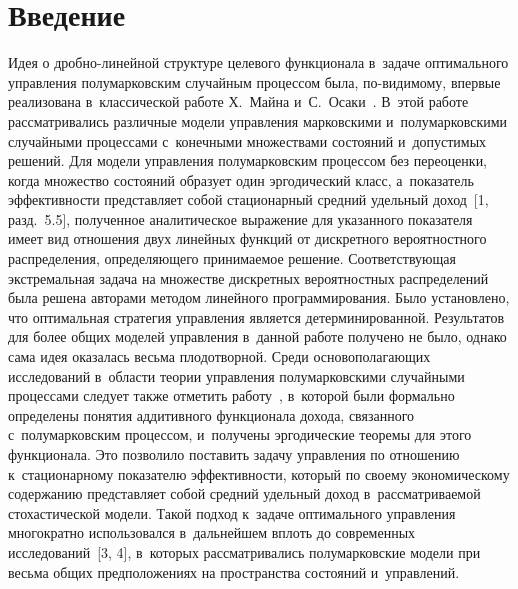
\thispagestyle{headings}

\begin{multicols}{2}

\label{st\stat}

\section{Введение}

\vspace*{-2pt}

Идея о дробно-ли\-ней\-ной структуре целевого функционала в~задаче оптимального 
управления полумарковским случайным процессом была, по-видимому, впервые 
реализована в~классической работе Х.~Майна и~С.~Осаки~\cite{1}. В~этой работе 
рассматривались различные модели управления марковскими и~полумарковскими 
случайными процессами с~конечными множествами состояний и~допустимых решений. 
Для модели управ\-ле\-ния полумарковским процессом без переоценки, когда множество 
состояний образует один эргодический класс, а~показатель эффективности 
представляет собой стационарный средний удельный доход~[1, разд.~5.5], 
полученное аналитическое выражение для указанного показателя имеет вид отношения\linebreak 
двух линейных функций от дискретного вероятностного распределения, определяющего 
принимаемое решение. Со\-от\-вет\-ст\-ву\-ющая \mbox{экстремальная} задача на множестве 
дискретных вероятностных распределений была решена авторами методом линейного 
программирования. Было установлено, что оптимальная стратегия управления 
является детерминированной. Результатов для более общих моделей управления 
в~данной работе получено не было, однако сама идея оказалась весьма плодотворной. 
Среди основополагающих исследований в~об\-ласти тео\-рии управ\-ле\-ния полумарковскими 
случайными процессами следует также отметить работу~\cite{2}, в~которой были 
формально определены понятия аддитивного функционала дохода, связанного 
с~полумарковским процессом, и~получены эргодические теоремы для этого функционала. 
Это позволило поставить задачу управления по отношению к~стационарному 
показателю эф\-фек\-тив\-ности, который по своему экономическому содержанию 
пред\-став\-ля\-ет собой средний удельный доход в~рассматриваемой стохастической 
модели. Такой подход к~задаче оптимального управления многократно использовался 
в~дальнейшем вплоть до современных исследований~[3, 4], в~которых 
рассматривались полумарковские модели при весьма общих предположениях на 
пространства состояний и~управ\-ле\-ний.


\end{multicols}
